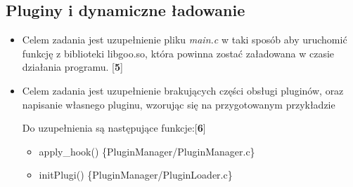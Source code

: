 \documentclass[12pt]{article}
\begin{document}
\subsection{Pluginy i dynamiczne ładowanie}
\begin{itemize}
\item Celem zadania jest uzupełnienie pliku \textit{main.c} w taki sposób aby
  uruchomić funkcję z biblioteki libgoo.so, która powinna zostać załadowana w
  czasie działania programu. [\textbf{5}]

\item Celem zadania jest uzupełnienie brakujących części obsługi pluginów, oraz
  napisanie własnego pluginu, wzorując się na przygotowanym przykładzie

  Do uzupełnienia są następujące funkcje:[\textbf{6}]

  \begin{itemize}
  \item apply\_hook() \{PluginManager/PluginManager.c\}
  \item initPlugi() \{PluginManager/PluginLoader.c\}
  \end{itemize}
\end{itemize}
\end{document}
